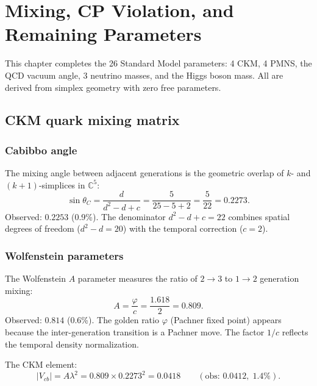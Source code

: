 \documentclass[12pt]{article}
\theoremstyle{remark}
\theoremstyle{definition}
\begin{document}
\section{Mixing, CP Violation, and Remaining Parameters}
\label{ch:mixing}

This chapter completes the 26 Standard Model parameters: 4 CKM, 4 PMNS, the QCD vacuum angle, 3 neutrino masses, and the Higgs boson mass. All are derived from simplex geometry with zero free parameters.

\subsection{CKM quark mixing matrix}

\subsubsection{Cabibbo angle}

The mixing angle between adjacent generations is the geometric overlap of $k$- and $(k+1)$-simplices in $\mathbb{C}^5$:
\begin{equation}
\sin\theta_C = \frac{d}{d^2 - d + c} = \frac{5}{25 - 5 + 2} = \frac{5}{22} = 0.2273.
\end{equation}
Observed: $0.2253$ (0.9\%). The denominator $d^2 - d + c = 22$ combines spatial degrees of freedom ($d^2 - d = 20$) with the temporal correction ($c = 2$).

\subsubsection{Wolfenstein parameters}

The Wolfenstein $A$ parameter measures the ratio of $2 \to 3$ to $1 \to 2$ generation mixing:
\begin{equation}
A = \frac{\varphi}{c} = \frac{1.618}{2} = 0.809.
\end{equation}
Observed: $0.814$ (0.6\%). The golden ratio $\varphi$ (Pachner fixed point) appears because the inter-generation transition is a Pachner move. The factor $1/c$ reflects the temporal density normalization.

The CKM element:
\begin{equation}
|V_{cb}| = A\lambda^2 = 0.809 \times 0.2273^2 = 0.0418 \qquad (\text{obs: } 0.0412,\; 1.4\%).
\end{equation}
\end{document}
